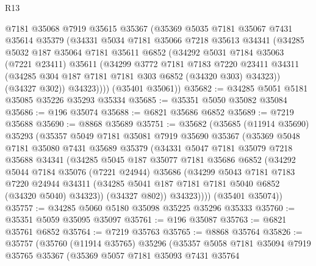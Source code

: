 \begin{lexlean}{R13}
\begin{coremodule}
        @7181
        @35068
        @7919
        @35615
        @35367
        (@35369
          @5035
          @7181
          @35067
          @7431
          @35614
          @35379
          (@34331
            @5034
            @7181
            @35066
            @7218
            @35613
            @34341
            (@34285
              @5032
              @187
              @35064
              @7181
              @35611
              @6852
              (@34292
                @5031
                @7184
                @35063
                (@7221 @23411)
                @35611
                (@34299
                  @3772
                  @7181
                  @7183
                  @7220
                  @23411
                  @34311
                  (@34285 @304 @187 @7181 @7181 @303 @6852 (@34320 @303) @34323))
                (@34327 @302))
              @34323))))
      (@35401 @35061))
@35682 := @34285 @5051 @5181 @35085 @35226 @35293 @35334
@35685 := @35351 @5050 @35082 @35084
@35686 := @196 @35074
@35688 := @6821 @35686 @6852
@35689 := @7219 @35688
@35690 := @8868 @35689
@35751 := @35682
    (@35685
      (@11914 @35690)
      @35293
      (@35357
        @5049
        @7181
        @35081
        @7919
        @35690
        @35367
        (@35369
          @5048
          @7181
          @35080
          @7431
          @35689
          @35379
          (@34331
            @5047
            @7181
            @35079
            @7218
            @35688
            @34341
            (@34285
              @5045
              @187
              @35077
              @7181
              @35686
              @6852
              (@34292
                @5044
                @7184
                @35076
                (@7221 @24944)
                @35686
                (@34299
                  @5043
                  @7181
                  @7183
                  @7220
                  @24944
                  @34311
                  (@34285 @5041 @187 @7181 @7181 @5040 @6852 (@34320 @5040) @34323))
                (@34327 @802))
              @34323))))
      (@35401 @35074))
@35757 := @34285 @5060 @5180 @35098 @35225 @35296 @35333
@35760 := @35351 @5059 @35095 @35097
@35761 := @196 @35087
@35763 := @6821 @35761 @6852
@35764 := @7219 @35763
@35765 := @8868 @35764
@35826 := @35757
    (@35760
      (@11914 @35765)
      @35296
      (@35357
        @5058
        @7181
        @35094
        @7919
        @35765
        @35367
        (@35369
          @5057
          @7181
          @35093
          @7431
          @35764

\end{coremodule}
\end{lexlean}
